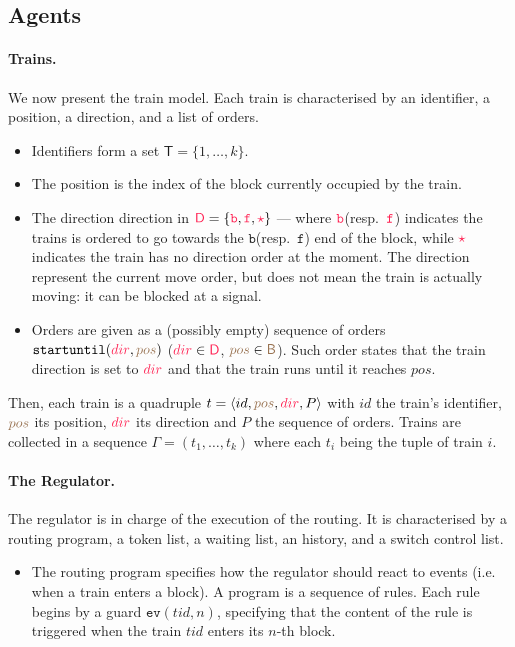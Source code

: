 \documentclass[runningheads]{llncs}
\newcommand{\directions}{\dirFmt{\mathsf{D}}}
\newcommand{\blocks}{{\posFmt{\mathsf{B}}}}
\newcommand{\forward}{\ensuremath{\mathtt{f}}}
\newcommand{\backward}{\ensuremath{\mathtt{b}}}
\newcommand{\dirFmt}[1]{{\color{dircolor}{#1}}}
\newcommand{\dirForward}{\ensuremath{\dirFmt{\forward}}\xspace}
\newcommand{\dirBackward}{\ensuremath{\dirFmt{\backward}}\xspace}
\newcommand{\dirStop}{\ensuremath{\dirFmt{\star}}\xspace}
\newcommand{\posFmt}[1]{{\color{poscolor}{#1}}}
\newcommand{\trainTuple}[4]{\langle #1, \posFmt{#2}, \dirFmt{#3}, #4 \rangle}
\newcommand{\trainSeq}{\Gamma}
\newcommand{\evGuard}[2]{\ensuremath{\mathtt{ev}(#1, #2)}}
\newcommand{\su}[2]{{\mbox{$\mathtt{startuntil}(\dirFmt{#1}, \posFmt{#2})$}}\xspace}
\newcommand{\trains}{{\mathsf{T}}}
\begin{document}
\subsection{Agents}
\paragraph{Trains.}
We now present the train model.
Each train is characterised by an identifier, a position, a direction, and a list of orders.
\begin{itemize}
	\item Identifiers form a set  $\trains = \{1, \ldots, k\}$.
	\item The position is the index of the block currently occupied by the train.
	\item The direction direction in $\directions = \{\dirBackward, \dirForward, \dirStop\}$ --- where \dirBackward (resp.\ \dirForward) indicates the trains is ordered to go towards the \backward (resp.\ \forward) end of the block, while \dirStop indicates the train has no direction order at the moment. The direction represent the current move order, but does not mean the train is actually moving: it can be blocked at a signal.
	\item Orders are given as a (possibly empty) sequence of orders $\su{dir}{pos}$ ($\dirFmt{dir} \in \directions$, $\posFmt{pos} \in \blocks$). Such order states that the train direction is set to $\dirFmt{dir}$ and that the train runs until it reaches $pos$.
\end{itemize}

Then, each train is a quadruple $t = \trainTuple{id}{pos}{dir}{P}$ with $id$ the train's identifier, $\posFmt{pos}$ its position, $\dirFmt{dir}$ its direction and $P$ the sequence of orders. Trains are collected in a sequence $\trainSeq = (t_1, \ldots, t_k)$ where each $t_i$ being the tuple of train $i$. 


\paragraph{The Regulator.}
The regulator is in charge of the execution of the routing.
It is characterised by a routing program, a token list, a waiting list, an history, and a switch control list.

\begin{itemize}
	\item The routing program specifies how the regulator should react to events (i.e. when a train enters a block). A program is a sequence of rules. Each rule begins by a guard \evGuard{tid}{n}, specifying that the content of the rule is triggered when the train $tid$ enters its $n$-th block.
\end{itemize}
\end{document}
